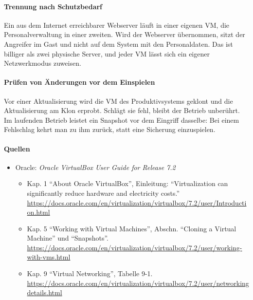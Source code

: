 \paragraph{Trennung nach Schutzbedarf} Ein aus dem Internet erreichbarer Webserver läuft in einer eigenen VM, die Personalverwaltung in einer zweiten. Wird der Webserver übernommen, sitzt der Angreifer im Gast und nicht auf dem System mit den Personaldaten. Das ist billiger als zwei physische Server, und jeder VM lässt sich ein eigener Netzwerkmodus zuweisen.

\paragraph{Prüfen von Änderungen vor dem Einspielen} Vor einer Aktualisierung wird die VM des Produktivsystems geklont und die Aktualisierung am Klon erprobt. Schlägt sie fehl, bleibt der Betrieb unberührt. Im laufenden Betrieb leistet ein Snapshot vor dem Eingriff dasselbe: Bei einem Fehlschlag kehrt man zu ihm zurück, statt eine Sicherung einzuspielen.

\paragraph{Quellen}
\begin{itemize}[quellen]
  \item Oracle: \emph{Oracle VirtualBox User Guide for Release 7.2}
  \begin{itemize}[nosep]
    \item Kap. 1 \enquote{About Oracle VirtualBox}, Einleitung: \enquote{Virtualization can significantly reduce hardware and electricity costs.} \url{https://docs.oracle.com/en/virtualization/virtualbox/7.2/user/Introduction.html}
    \item Kap. 5 \enquote{Working with Virtual Machines}, Abschn. \enquote{Cloning a Virtual Machine} und \enquote{Snapshots}. \url{https://docs.oracle.com/en/virtualization/virtualbox/7.2/user/working-with-vms.html}
    \item Kap. 9 \enquote{Virtual Networking}, Tabelle 9-1. \url{https://docs.oracle.com/en/virtualization/virtualbox/7.2/user/networkingdetails.html}
  \end{itemize}
\end{itemize}

\begin{aufgabe}
\end{aufgabe}


